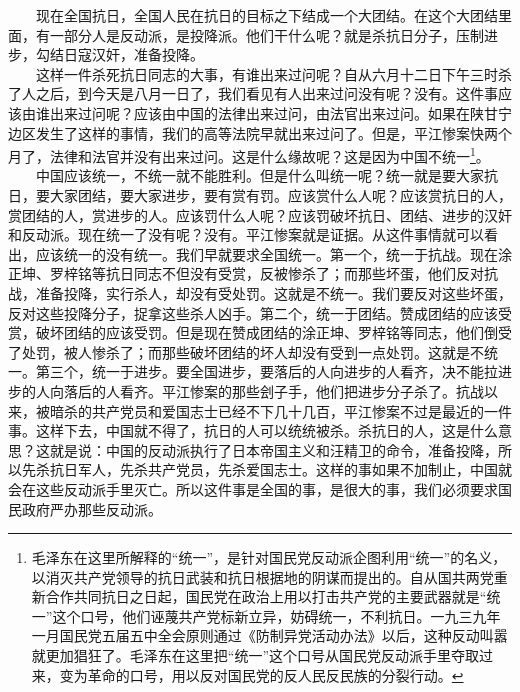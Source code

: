 \documentclass[cn,11pt,chinese]{elegantbook}
\begin{document}
　　现在全国抗日，全国人民在抗日的目标之下结成一个大团结。在这个大团结里面，有一部分人是反动派，是投降派。他们干什么呢？就是杀抗日分子，压制进步，勾结日寇汉奸，准备投降。\\
　　这样一件杀死抗日同志的大事，有谁出来过问呢？自从六月十二日下午三时杀了人之后，到今天是八月一日了，我们看见有人出来过问没有呢？没有。这件事应该由谁出来过问呢？应该由中国的法律出来过问，由法官出来过问。如果在陕甘宁边区发生了这样的事情，我们的高等法院早就出来过问了。但是，平江惨案快两个月了，法律和法官并没有出来过问。这是什么缘故呢？这是因为中国不统一\footnote[3]{ 毛泽东在这里所解释的“统一”，是针对国民党反动派企图利用“统一”的名义，以消灭共产党领导的抗日武装和抗日根据地的阴谋而提出的。自从国共两党重新合作共同抗日之日起，国民党在政治上用以打击共产党的主要武器就是“统一”这个口号，他们诬蔑共产党标新立异，妨碍统一，不利抗日。一九三九年一月国民党五届五中全会原则通过《防制异党活动办法》以后，这种反动叫嚣就更加猖狂了。毛泽东在这里把“统一”这个口号从国民党反动派手里夺取过来，变为革命的口号，用以反对国民党的反人民反民族的分裂行动。}。\\
　　中国应该统一，不统一就不能胜利。但是什么叫统一呢？统一就是要大家抗日，要大家团结，要大家进步，要有赏有罚。应该赏什么人呢？应该赏抗日的人，赏团结的人，赏进步的人。应该罚什么人呢？应该罚破坏抗日、团结、进步的汉奸和反动派。现在统一了没有呢？没有。平江惨案就是证据。从这件事情就可以看出，应该统一的没有统一。我们早就要求全国统一。第一个，统一于抗战。现在涂正坤、罗梓铭等抗日同志不但没有受赏，反被惨杀了；而那些坏蛋，他们反对抗战，准备投降，实行杀人，却没有受处罚。这就是不统一。我们要反对这些坏蛋，反对这些投降分子，捉拿这些杀人凶手。第二个，统一于团结。赞成团结的应该受赏，破坏团结的应该受罚。但是现在赞成团结的涂正坤、罗梓铭等同志，他们倒受了处罚，被人惨杀了；而那些破坏团结的坏人却没有受到一点处罚。这就是不统一。第三个，统一于进步。要全国进步，要落后的人向进步的人看齐，决不能拉进步的人向落后的人看齐。平江惨案的那些刽子手，他们把进步分子杀了。抗战以来，被暗杀的共产党员和爱国志士已经不下几十几百，平江惨案不过是最近的一件事。这样下去，中国就不得了，抗日的人可以统统被杀。杀抗日的人，这是什么意思？这就是说：中国的反动派执行了日本帝国主义和汪精卫的命令，准备投降，所以先杀抗日军人，先杀共产党员，先杀爱国志士。这样的事如果不加制止，中国就会在这些反动派手里灭亡。所以这件事是全国的事，是很大的事，我们必须要求国民政府严办那些反动派。\\
\end{document}

